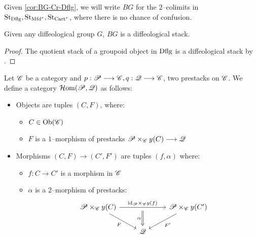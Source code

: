 \documentclass[11pt]{amsart}
\begin{document}
\begin{notn}
Given \cref{cor:BG-Cr-Dflg}, we will write $BG$ for the $2$--colimits in
$\mathrm{St}_{\mathrm{Dflg}}, \mathrm{St}_{\mathrm{Mfd}^r}, \mathrm{St}_{\mathrm{Cart}^r}$, where there is no chance of confusion.
\end{notn}

\begin{thm}\label{thm:BG-dflg}
Given any diffeological group $G$, $BG$ is a diffeological stack.
\end{thm}
\begin{proof}
The quotient stack of a groupoid object in $\mathrm{Dflg}$ is a diffeological stack by
\cite[Theorem 2.10]{RV18}.
\end{proof}

\begin{defn}
Let $\mathscr{C}$ be a category and $p : \sP \to \sC, q : \sQ \to \sC$, two prestacks on $\mathscr{C}$.
We define a category $\mathcal{H}\mathrm{om}(\mathscr{P}, \mathscr{Q})$ as follows:
\begin{itemize}
\item Objects are tuples $(C, F)$, where:
  \begin{itemize}
  \item $C \in \Ob{\sC}$
  \item $F$ is a $1$--morphism of prestacks $\sP \times_\sC y(C) \to \sQ$
  \end{itemize}
\item Morphisms $(C, F) \to (C', F')$ are tuples $(f, \alpha)$ where:
  \begin{itemize}
  \item $f : C \to C'$ is a morphism in $\mathscr{C}$
  \item $\alpha$ is a $2$--morphism of prestacks:
  \[\begin{tikzcd}
  \sP \times_\sC y(C)
    \ar[rd, "F" below left]
    \ar[rr, "\id_\sP \times_\sC y(f)" above, ""{name=S, below}]  & &
  \sP \times_\sC y(C') \ar[ld, "F'" below right] \\
  & \sQ &
  \ar[from=S, to=2-2, Rightarrow, "\alpha" left]
  \end{tikzcd}\]
  \end{itemize}
\end{itemize}
\end{defn}
\end{document}
